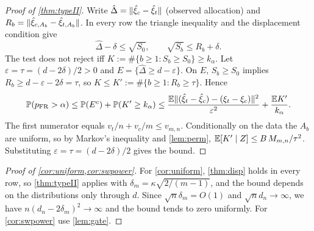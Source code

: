 \documentclass[11pt,a4paper]{article}
\begin{document}
\begin{proof}[Proof of \cref{thm:typeII}]
Write $\hat\Delta=\lVert \hat\xi_c-\hat\xi_t\rVert$ (observed allocation) and $R_b=\lVert \hat\xi_{c,A_b}-\hat\xi_{t,A_b}\rVert$. In every row the triangle inequality and the displacement condition give
\[
\hat\Delta-\delta\le\sqrt{S_0},\qquad \sqrt{S_b}\le R_b+\delta .
\]
The test does not reject iff $K:=\#\{b\ge1:S_b\ge S_0\}\ge k_\alpha$. Let $\varepsilon=\tau=(d-2\delta)/2>0$ and $E=\{\hat\Delta\ge d-\varepsilon\}$. On $E$, $S_b\ge S_0$ implies $R_b\ge d-\varepsilon-2\delta=\tau$, so $K\le K':=\#\{b\ge1:R_b\ge\tau\}$. Hence
\[
\mathbb{P}(p_{\rm FR}>\alpha)\le\mathbb{P}(E^c)+\mathbb{P}(K'\ge k_\alpha)\le\frac{\mathbb{E}\lVert (\hat\xi_t-\hat\xi_c)-(\xi_t-\xi_c)\rVert^2}{\varepsilon^2}+\frac{\mathbb{E} K'}{k_\alpha}.
\]
The first numerator equals $v_t/n+v_c/m\le v_{m,n}$. Conditionally on the data the $A_b$ are uniform, so by Markov's inequality and \cref{lem:perm}, $\mathbb{E}[K'\mid Z]\le B\,M_{m,n}/\tau^2$. Substituting $\varepsilon=\tau=(d-2\delta)/2$ gives the bound.
\end{proof}

\begin{proof}[Proof of \cref{cor:uniform,cor:swpower}]
For \cref{cor:uniform}, \cref{thm:disp} holds in every row, so \cref{thm:typeII} applies with $\delta_m=\kappa\sqrt{2/(m-1)}$, and the bound depends on the distributions only through $d$. Since $\sqrt n\delta_m=O(1)$ and $\sqrt nd_n\to\infty$, we have $n(d_n-2\delta_m)^2\to\infty$ and the bound tends to zero uniformly. For \cref{cor:swpower} use \cref{lem:gate}.
\end{proof}
\end{document}
